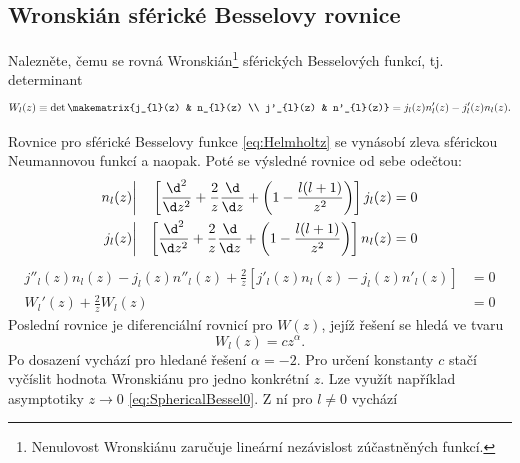 \subsection{Wronskián sférické Besselovy rovnice}
Nalezněte, čemu se rovná Wronskián\footnote{
    Nenulovost Wronskiánu zaručuje lineární nezávislost zúčastněných funkcí.
}
sférických Besselových funkcí, tj. determinant
\begin{equation}
    W_{l}(z)
        \equiv\det\makematrix{j_{l}(z) & n_{l}(z) \\ j'_{l}(z) & n'_{l}(z)}
        =j_{l}(z)n'_{l}(z)-j'_{l}(z)n_{l}(z).
\end{equation}

\begin{solution}
    Rovnice pro sférické Besselovy funkce \eqref{eq:Helmholtz} se vynásobí zleva sférickou Neumannovou funkcí a naopak.
    Poté se výsledné rovnice od sebe odečtou:
    \begin{subequations}
        \begin{align}
            n_{l}(z)&\bigg|
            &\left[\frac{\d^{2}}{\d z^{2}}+\frac{2}{z}\frac{\d}{\d z}+
                        \left(1-\frac{l(l+1)}{z^{2}}\right)\right]j_{l}(z)
            &=0\\
            j_{l}(z)&\bigg|
            &\left[\frac{\d^{2}}{\d z^{2}}+\frac{2}{z}\frac{\d}{\d z}+
                        \left(1-\frac{l(l+1)}{z^{2}}\right)\right]n_{l}(z)
            &=0
        \end{align}            
    \end{subequations}
    \begin{subequations}
        \begin{align}
            j''_{l}(z)n_{l}(z)-j_{l}(z)n''_{l}(z)+\frac{2}{z}\left[j'_{l}(z)n_{l}(z)-j_{l}(z)n'_{l}(z)\right]
                &=0\\
            W_{l}'(z)+\frac{2}{z}W_{l}(z)
                &=0
        \end{align}            
    \end{subequations}
    Poslední rovnice je diferenciální rovnicí pro $W(z)$, jejíž řešení se hledá ve tvaru
    \begin{equation}
        W_{l}(z)=cz^{\alpha}.
    \end{equation}
    Po dosazení vychází pro hledané řešení $\alpha=-2$.
    Pro určení konstanty $c$ stačí vyčíslit hodnota Wronskiánu pro jedno konkrétní $z$.
    Lze využít například asymptotiky $z\rightarrow0$ \eqref{eq:SphericalBessel0}.
    Z ní pro $l\neq0$ vychází

\end{solution}
